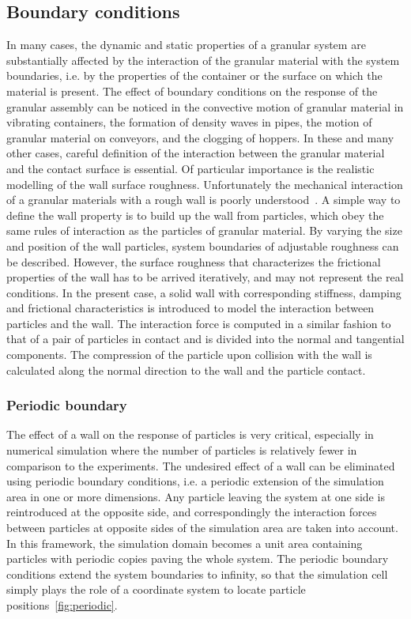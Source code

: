 \subsection{Boundary conditions}
In many cases, the dynamic and static properties of a granular system are 
substantially affected 
by 
the interaction of the granular material with the system boundaries, i.e. by 
the properties of the 
container or the surface on which the material is present. The effect of 
boundary conditions on 
the 
response of the granular assembly can be noticed in the convective motion of 
granular material in 
vibrating containers, the formation of density waves in pipes, the motion of 
granular material on 
conveyors, and the clogging of hoppers. In these and many other cases, careful 
definition of the 
interaction between the granular material and the contact surface is essential. 
Of particular 
importance is the realistic modelling of the wall surface roughness. 
Unfortunately the mechanical 
interaction of a granular materials with a rough wall is poorly 
understood~\citep{Posch2005}. A 
simple way to define the wall property is to build up the wall from particles, 
which obey the same 
rules of interaction as the particles of granular material. By varying the size 
and position of 
the 
wall particles, system boundaries of adjustable roughness can be described. 
However, the surface 
roughness that characterizes the frictional properties of the wall has to be 
arrived iteratively, 
and may not represent the real conditions. In the present case, a solid wall 
with corresponding 
stiffness, damping and frictional characteristics is introduced to model the 
interaction between 
particles and the wall. The interaction force is computed in a similar fashion 
to that of a pair 
of 
particles in contact and is divided into the normal and tangential components. 
The compression of 
the particle upon collision with the wall is calculated along the normal 
direction to the wall and 
the particle contact.   

\subsubsection{Periodic boundary} \label{periodic}
The effect of a wall on the response of particles is very critical, especially 
in numerical 
simulation where the number of particles is relatively fewer in comparison to 
the experiments. The 
undesired effect of a wall can be eliminated using periodic boundary 
conditions, i.e. a periodic 
extension of the simulation area in one or more dimensions. Any particle 
leaving the system at one 
side is reintroduced at the opposite side, and correspondingly the interaction 
forces between 
particles at opposite sides of the simulation area are taken into account. In 
this framework, the 
simulation domain becomes a unit area containing particles with periodic copies 
paving the whole 
system. The periodic boundary conditions extend the system boundaries to 
infinity, so that the 
simulation cell simply plays the role of a coordinate system to locate particle 
positions~\ref{fig:periodic}. 

